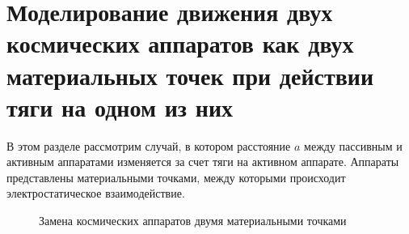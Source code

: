 \section{Моделирование движения двух космических аппаратов как двух материальных точек при действии тяги на одном из них}
\label{SEC:2SPH}

В этом разделе рассмотрим случай, в котором расстояние $a$ между пассивным и активным аппаратами изменяется за счет тяги на активном аппарате.
Аппараты представлены материальными точками, между которыми происходит электростатическое взаимодействие.

\begin{figure}[H]
	\caption{Замена космических аппаратов двумя материальными точками}
	\label{ris:3sph}
\end{figure}

